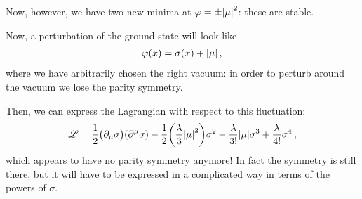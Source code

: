 \documentclass[main.tex]{subfiles}
\begin{document}
Now, however, we have two new minima at \(\varphi = \pm \abs{\mu }^2\): these are stable.

Now, a perturbation of the ground state will look like 
%
\begin{align}
\varphi (x) = \sigma (x) + \abs{\mu }
\,,
\end{align}
%
where we have arbitrarily chosen the right vacuum: in order to perturb around the vacuum we lose the parity symmetry. 

Then, we can express the Lagrangian with respect to this fluctuation: 
%
\begin{align}
\mathscr{L} = \frac{1}{2} \qty(\partial_{\mu }\sigma ) \qty(\partial^{\mu }\sigma ) - \frac{1}{2} \qty(\frac{\lambda }{3} \abs{\mu }^2)\sigma^2 - \frac{\lambda}{3!} \abs{\mu } \sigma^3 + \frac{\lambda}{4!} \sigma^{4}
\,,
\end{align}
%
which appears to have no parity symmetry anymore! 
In fact the symmetry is still there, but it will have to be expressed in a complicated way in terms of the powers of \(\sigma \). 
\end{document}
